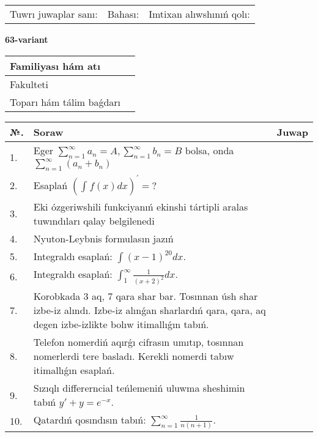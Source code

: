 \documentclass{article}
\begin{document}
\vspace{1cm}

\begin{tabular}{ c c c }
Tuwrı juwaplar sanı: \underline{\hspace{2cm}} & Bahası: \underline{\hspace{2cm}} & Imtixan alıwshınıń qolı: \underline{\hspace{2cm}} \\
\end{tabular}

\newpage

\begin{center}\textbf{63-variant}\end{center}

\bgroup
\def\arraystretch{1.5}
\begin{tabular}{ |m{6cm}|m{10cm}| }
  \hline
  Familiyası hám atı & \\
  \hline
  Fakulteti &\\
  \hline
  Toparı hám tálim baǵdarı & \\
  \hline
\end{tabular}
\egroup

\vspace{0.5cm}

\bgroup
\def\arraystretch{2}
\begin{tabular}{ |l|m{8cm}|m{7cm}| }
  \hline
  №. & Soraw & Juwap \\
  \hline
  1. & Eger $\displaystyle\sum_{n = 1}^{\infty}a_{n} = A, \sum_{n = 1}^{\infty}b_{n} = B$ bolsa, onda $\displaystyle\sum_{n = 1}^{\infty}\left( a_{n} + b_{n} \right)$ &  \\
  \hline
  2. & Esaplań $\displaystyle \left( \int_{}^{}{f(x)dx} \right)^\prime = ?$ &  \\
  \hline
  3. & Eki ózgeriwshili funkciyanıń ekinshi tártipli aralas tuwındıları qalay belgilenedi &  \\
  \hline
  4. & Nyuton-Leybnis formulasın jazıń &  \\
  \hline
  5. & Integraldı esaplań: $\displaystyle\int (x - 1)^{20}dx$. &  \\
  \hline
  6. & Integraldı esaplań: $\displaystyle\int_{1}^{\infty}{\frac{1}{\left( x + 2 \right)^{2}}dx }$. &  \\
  \hline
  7. & Korobkada 3 aq, 7 qara shar bar. Tosınnan úsh shar izbe-iz alındı. Izbe-iz alınǵan sharlardıń qara, qara, aq degen izbe-izlikte bolıw itimallıǵın tabıń. &  \\
  \hline
  8. & Telefon nomerdiń aqırǵı cifrasın umıtıp, tosınnan nomerlerdi tere basladı. Kerekli nomerdi tabıw itimallıǵın esaplań. &  \\
  \hline
  9. & Sızıqlı differerncial teńlemeniń uluwma sheshimin tabıń $y' + y =e^{-x}$. &  \\
  \hline
  10. & Qatardıń qosındısın tabıń: $\displaystyle\sum_{n = 1}^{\infty}\frac{1}{n(n + 1)}$. &  \\
  \hline
\end{tabular}
\egroup
\end{document}
